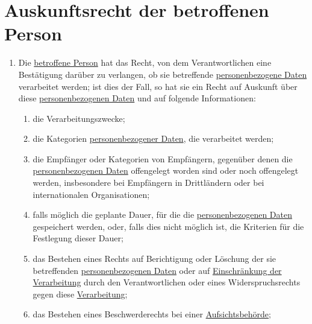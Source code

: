 \chapter{Auskunftsrecht der betroffenen Person}
\label{ch:15}


\begin{enumerate}

  \item Die \hyperref[itm:04-1]{betroffene Person} hat das Recht, von dem Verantwortlichen eine Bestätigung darüber zu verlangen, ob sie
   betreffende \hyperref[itm:04-1]{personenbezogene Daten} verarbeitet werden; ist dies der Fall, so hat sie ein Recht auf Auskunft über
   diese \hyperref[itm:04-1]{personenbezogenen Daten} und auf folgende Informationen:
  \label{itm:15-1}

  \begin{enumerate}
  
    \item die Verarbeitungszwecke;
    \label{itm:15-1a}

    \item die Kategorien \hyperref[itm:04-1]{personenbezogener Daten}, die verarbeitet werden;
    \label{itm:15-1b}

    \item die Empfänger oder Kategorien von Empfängern, gegenüber denen die \hyperref[itm:04-1]{personenbezogenen Daten} offengelegt worden
     sind oder noch offengelegt werden, insbesondere bei Empfängern in Drittländern oder bei internationalen
     Organisationen;
    \label{itm:15-1c}

    \item falls möglich die geplante Dauer, für die die \hyperref[itm:04-1]{personenbezogenen Daten} gespeichert werden, oder, falls dies
     nicht möglich ist, die Kriterien für die Festlegung dieser Dauer;
    \label{itm:15-1d}

    \item das Bestehen eines Rechts auf Berichtigung oder Löschung der sie betreffenden \hyperref[itm:04-1]{personenbezogenen Daten} oder auf
     \hyperref[itm:04-3]{Einschränkung der Verarbeitung} durch den Verantwortlichen oder eines Widerspruchsrechts gegen diese \hyperref[itm:04-2]{Verarbeitung};
    \label{itm:15-1e}

    \item das Bestehen eines Beschwerderechts bei einer \hyperref[itm:04-21]{Aufsichtsbehörde};
    \label{itm:15-1f}


\end{enumerate}
\end{enumerate}
